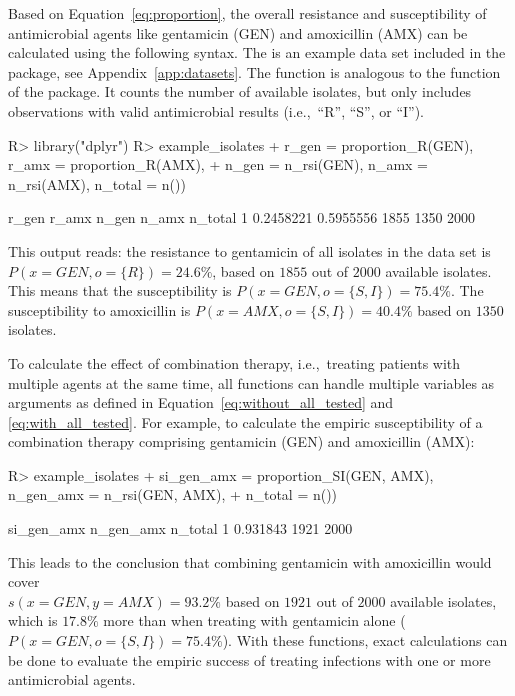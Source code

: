 \documentclass[article, shortnames]{jss}
\newcommand{\fct}[1]{\code{#1()}}
\begin{document}
Based on Equation~\ref{eq:proportion}, the overall resistance and
susceptibility of antimicrobial agents like gentamicin (GEN) and amoxicillin
(AMX) can be calculated using the following syntax.  The
 is an example data set included in the 
package, see Appendix~\ref{app:datasets}.  The \fct{n\_rsi} function is
analogous to the \fct{n} function of the  package.  It counts the
number of available isolates, but only includes observations with valid
antimicrobial results (i.e.,~``R'', ``S'', or ``I'').
%
\begin{CodeChunk}
\begin{CodeInput}
R> library("dplyr")
R> example_isolates %
+    r_gen = proportion_R(GEN), r_amx = proportion_R(AMX),
+    n_gen = n_rsi(GEN), n_amx = n_rsi(AMX), n_total = n())
\end{CodeInput}
\begin{CodeOutput}
      r_gen     r_amx n_gen n_amx n_total
1 0.2458221 0.5955556  1855  1350    2000
\end{CodeOutput}
\end{CodeChunk}
%
This output reads: the resistance to gentamicin of all isolates in the
 data set is $P{(x = GEN, o = \{R\})} = 24.6\%$,
based on $1855$ out of $2000$ available isolates.  This means that the
susceptibility is $P{(x = GEN, o = \{S,I\})} = 75.4\%$.  The susceptibility
to amoxicillin is $P{(x = AMX, o = \{S,I\})} = 40.4\%$ based on $1350$
isolates.

To calculate the effect of combination therapy, i.e.,~treating patients with
multiple agents at the same time, all \fct{proportion\_*} functions can
handle multiple variables as arguments as defined in
Equation~\ref{eq:without_all_tested} and \ref{eq:with_all_tested}.  For
example, to calculate the empiric susceptibility of a combination therapy
comprising gentamicin (GEN) and amoxicillin (AMX):
%
\begin{CodeChunk}
\begin{CodeInput}
R> example_isolates %
+    si_gen_amx = proportion_SI(GEN, AMX), n_gen_amx = n_rsi(GEN, AMX),
+    n_total = n())
\end{CodeInput}
\begin{CodeOutput}
  si_gen_amx n_gen_amx n_total
1   0.931843      1921    2000
\end{CodeOutput}
\end{CodeChunk}
%
This leads to the conclusion that combining gentamicin with amoxicillin
would cover \\$s{(x = GEN, y = AMX)} = 93.2\%$ based on $1921$ out of $2000$
available isolates, which is $17.8\%$ more than when treating with
gentamicin alone ($P{(x = GEN, o = \{S,I\})} = 75.4\%$).  With these
functions, exact calculations can be done to evaluate the empiric success of
treating infections with one or more antimicrobial agents.
\end{document}
